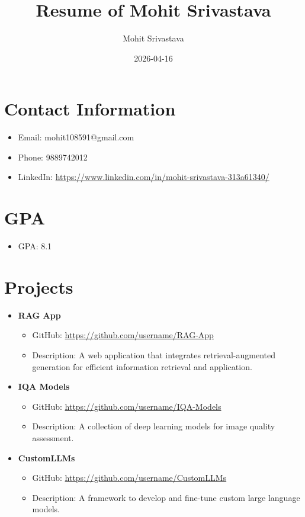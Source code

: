 \documentclass{article}
\begin{document}
\title{Resume of Mohit Srivastava}
\author{Mohit Srivastava}
\date{2026-04-16}
\maketitle

\section*{Contact Information}
\begin{itemize}
    \item Email: mohit108591@gmail.com
    \item Phone: 9889742012
    \item LinkedIn: \url{https://www.linkedin.com/in/mohit-srivastava-313a61340/}
\end{itemize}

\section*{GPA}
\begin{itemize}
    \item GPA: 8.1
\end{itemize}

\section*{Projects}
\begin{itemize}
    \item \textbf{RAG App} 
    \begin{itemize}
        \item GitHub: \url{https://github.com/username/RAG-App}
        \item Description: A web application that integrates retrieval-augmented generation for efficient information retrieval and application.
    \end{itemize}
    \item \textbf{IQA Models}
    \begin{itemize}
        \item GitHub: \url{https://github.com/username/IQA-Models}
        \item Description: A collection of deep learning models for image quality assessment.
    \end{itemize}
    \item \textbf{CustomLLMs}
    \begin{itemize}
        \item GitHub: \url{https://github.com/username/CustomLLMs}
        \item Description: A framework to develop and fine-tune custom large language models.
    \end{itemize}
\end{itemize}
\end{document}
